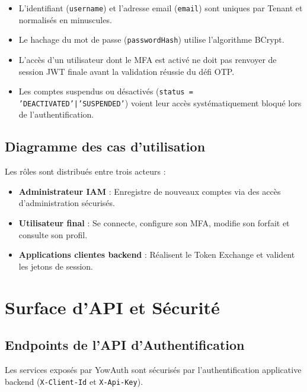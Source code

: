 \documentclass[
]{IPLeiriaThesis}
\newcommand{\code}[1]{\texttt{\small #1}}
\begin{document}
\begin{invbox}
\begin{itemize}
  \item L'identifiant (\code{username}) et l'adresse email (\code{email}) sont uniques par Tenant et normalisés en minuscules.
  \item Le hachage du mot de passe (\code{passwordHash}) utilise l'algorithme BCrypt.
  \item L'accès d'un utilisateur dont le MFA est activé ne doit pas renvoyer de session JWT finale avant la validation réussie du défi OTP.
  \item Les comptes suspendus ou désactivés (\code{status = 'DEACTIVATED'|'SUSPENDED'}) voient leur accès systématiquement bloqué lors de l'authentification.
\end{itemize}
\end{invbox}

\section{Diagramme des cas d'utilisation}
Les rôles sont distribués entre trois acteurs :
\begin{itemize}
  \item \textbf{Administrateur IAM} : Enregistre de nouveaux comptes via des accès d'administration sécurisés.
  \item \textbf{Utilisateur final} : Se connecte, configure son MFA, modifie son forfait et consulte son profil.
  \item \textbf{Applications clientes backend} : Réalisent le Token Exchange et valident les jetons de session.
\end{itemize}

\chapter{Surface d'API et Sécurité}

\section{Endpoints de l'API d'Authentification}
Les services exposés par YowAuth sont sécurisés par l'authentification applicative backend (\code{X-Client-Id} et \code{X-Api-Key}).
\end{document}
